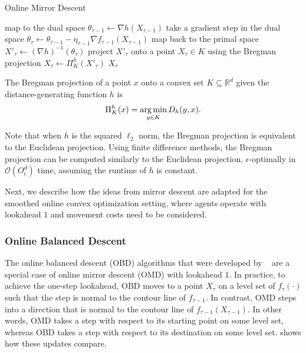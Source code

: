 \begin{algorithm}
    \caption{Online Mirror Descent~\cite{Gupta2020}}\label{alg:md:omd}
    map to the dual space $\theta_{\tau-1} \gets \nabla h (X_{\tau-1})$\;
    take a gradient step in the dual space $\theta_{\tau} \gets \theta_{\tau-1} - \eta_{\tau-1} \nabla f_{\tau-1}(X_{\tau-1})$\;
    map back to the primal space $X'_{\tau} \gets (\nabla h)^{-1}(\theta_{\tau})$\;
    project $X'_{\tau}$ onto a point $X_{\tau} \in K$ using the Bregman projection $X_{\tau} \gets \Pi_K^h(X'_{\tau})$\;
    \Return $X_{\tau}$\;
\end{algorithm}

\begin{definition}
\cite{Gupta2020} The Bregman projection of a point $x$ onto a convex set $K \subseteq \mathbb{R}^d$ given the distance-generating function $h$ is \begin{align*}
    \Pi_K^h(x) = \operatorname*{arg\,min}_{y \in K} D_h(y,x).
\end{align*}
\end{definition}

Note that when $h$ is the squared $\ell_2$ norm, the Bregman projection is equivalent to the Euclidean projection. Using finite difference methods, the Bregman projection can be computed similarly to the Euclidean projection, $\epsilon$-optimally in $\mathcal{O}(O_{\epsilon}^d)$ time, assuming the runtime of $h$ is constant.

Next, we describe how the ideas from mirror descent are adapted for the smoothed online convex optimization setting, where agents operate with lookahead $1$ and movement costs need to be considered.

\subsubsection{Online Balanced Descent}\label{section:online_algorithms:md:descent_methods:obd}

The online balanced descent (OBD) algorithms that were developed by \citeauthor{Chen2018}~\cite{Chen2018} are a special case of online mirror descent (OMD) with lookahead $1$. In practice, to achieve the one-step lookahead, OBD moves to a point $X_{\tau}$ on a level set of $f_{\tau}(\cdot)$ such that the step is normal to the contour line of $f_{\tau-1}$. In contrast, OMD steps into a direction that is normal to the contour line of $f_{\tau-1}(X_{\tau-1})$. In other words, OMD takes a step with respect to its starting point on some level set, whereas OBD takes a step with respect to its destination on some level set.  shows how these updates compare.

